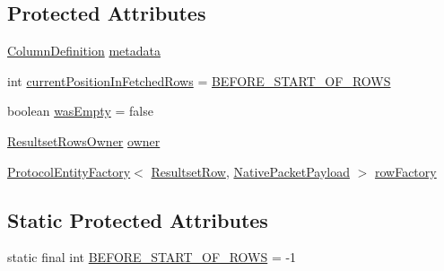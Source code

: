 \subsection*{Protected Attributes}
\begin{DoxyCompactItemize}
\item 
\mbox{\hyperlink{interfacecom_1_1mysql_1_1cj_1_1protocol_1_1_column_definition}{Column\+Definition}} \mbox{\hyperlink{classcom_1_1mysql_1_1cj_1_1protocol_1_1a_1_1result_1_1_abstract_resultset_rows_a6198167d21b19a82cb1191eaf226cad2}{metadata}}
\item 
int \mbox{\hyperlink{classcom_1_1mysql_1_1cj_1_1protocol_1_1a_1_1result_1_1_abstract_resultset_rows_ab6b652ef15f4d82cb9048d951bf1f82c}{current\+Position\+In\+Fetched\+Rows}} = \mbox{\hyperlink{classcom_1_1mysql_1_1cj_1_1protocol_1_1a_1_1result_1_1_abstract_resultset_rows_a94be6a28f1ebe4c8bfe5b4907dc44083}{B\+E\+F\+O\+R\+E\+\_\+\+S\+T\+A\+R\+T\+\_\+\+O\+F\+\_\+\+R\+O\+WS}}
\item 
boolean \mbox{\hyperlink{classcom_1_1mysql_1_1cj_1_1protocol_1_1a_1_1result_1_1_abstract_resultset_rows_a345210cb918e444becdccda3d38f72a8}{was\+Empty}} = false
\item 
\mbox{\hyperlink{interfacecom_1_1mysql_1_1cj_1_1protocol_1_1_resultset_rows_owner}{Resultset\+Rows\+Owner}} \mbox{\hyperlink{classcom_1_1mysql_1_1cj_1_1protocol_1_1a_1_1result_1_1_abstract_resultset_rows_ac0fe5a90927b98441be0c579daefbf7f}{owner}}
\item 
\mbox{\hyperlink{interfacecom_1_1mysql_1_1cj_1_1protocol_1_1_protocol_entity_factory}{Protocol\+Entity\+Factory}}$<$ \mbox{\hyperlink{interfacecom_1_1mysql_1_1cj_1_1protocol_1_1_resultset_row}{Resultset\+Row}}, \mbox{\hyperlink{classcom_1_1mysql_1_1cj_1_1protocol_1_1a_1_1_native_packet_payload}{Native\+Packet\+Payload}} $>$ \mbox{\hyperlink{classcom_1_1mysql_1_1cj_1_1protocol_1_1a_1_1result_1_1_abstract_resultset_rows_a97429d9b79ecd07252a5c1434fd7c1a4}{row\+Factory}}
\end{DoxyCompactItemize}
\subsection*{Static Protected Attributes}
\begin{DoxyCompactItemize}
\item 
static final int \mbox{\hyperlink{classcom_1_1mysql_1_1cj_1_1protocol_1_1a_1_1result_1_1_abstract_resultset_rows_a94be6a28f1ebe4c8bfe5b4907dc44083}{B\+E\+F\+O\+R\+E\+\_\+\+S\+T\+A\+R\+T\+\_\+\+O\+F\+\_\+\+R\+O\+WS}} = -\/1
\end{DoxyCompactItemize}
